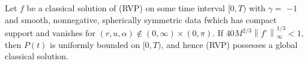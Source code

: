 \begin{theorem}
Let $f$ be a classical solution of (RVP) on some time interval $[0, T)$ with $\gamma=$
$-1$ and smooth, nonnegative, spherically symmetric data fwhich has compact support
and vanishes for $(r, u, \alpha) \notin(0, \infty) \times(0, \pi) .$ If $40 M^{2 / 3}\left\|f^{\circ}\right\|_{\infty}^{1 / 3}<1,$ then $P(t)$ is uniformly bounded on $[0, T)$, and hence (RVP) possesses a global classical solution.
\end{theorem}










